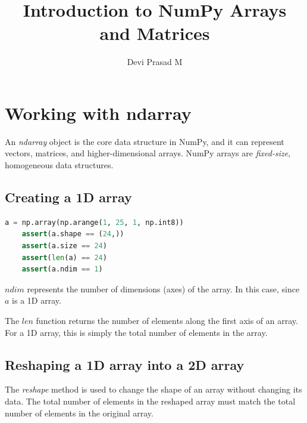\documentclass[12pt]{article}
\title{Introduction to NumPy Arrays and Matrices}
\author{Devi Prasad M}
\newcommand{\vsp}{\vspace*{8pt}}
\begin{document}
\pagecolor{yellow!30!brown!20}





\maketitle

\section{Working with ndarray}
An \emph{ndarray} object is the core data structure in NumPy, and
it can represent vectors, matrices, and higher-dimensional arrays.
NumPy arrays are \emph{fixed-size}, homogeneous data structures.

\vsp\subsection{Creating a 1D array}
\begin{lstlisting}[language=Python]
    a = np.array(np.arange(1, 25, 1, np.int8))
    assert(a.shape == (24,))
    assert(a.size == 24)
    assert(len(a) == 24)
    assert(a.ndim == 1)
\end{lstlisting}

$ndim$ represents the number of dimensions (axes) of
the array. In this case, since $a$ is a 1D array.

The $len$ function returns the number of elements along the
first axis of an array. For a 1D array, this is simply the total
number of elements in the array.

\subsection{Reshaping a 1D array into a 2D array}
The \emph{reshape} method is used to change the shape of
an array without changing its data. The total number of elements
in the reshaped array must match the total number of elements
in the original array.
\end{document}
